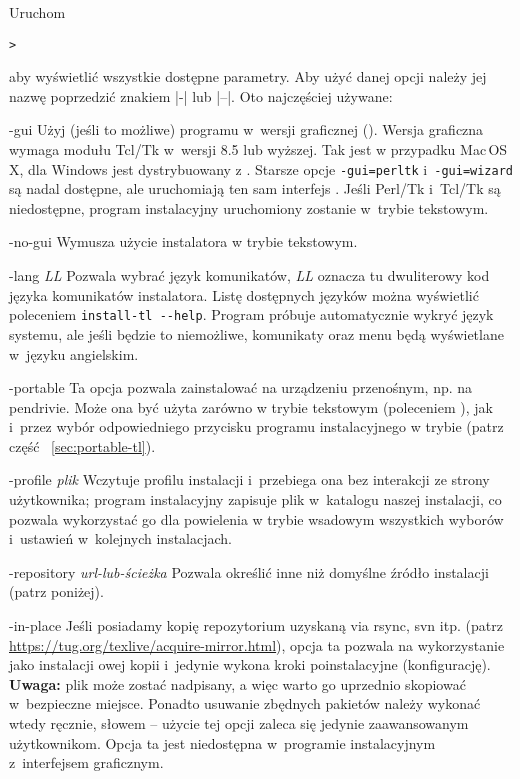 \documentclass{article}
\let\textsl\textit
\begin{document}
Uruchom
\begin{alltt}
> 
\end{alltt}
aby wyświetlić wszystkie dostępne parametry. Aby użyć danej opcji należy jej
nazwę poprzedzić znakiem |-| lub |--|.  Oto najczęściej używane:

\begin{ttdescription}
\item[-gui] Użyj (jeśli to możliwe) programu w~wersji graficznej (\GUI). Wersja graficzna wymaga
 modułu Tcl/Tk w~wersji 8.5 lub wyższej.  Tak jest w przypadku Mac\,OS\,X, dla Windows jest
 dystrybuowany z \TL. Starsze opcje  \texttt{-gui=perltk} i~\texttt{-gui=wizard} są nadal dostępne,
 ale uruchomiają ten sam interfejs \GUI{}. Jeśli  Perl/Tk i~Tcl/Tk są niedostępne,
 program instalacyjny uruchomiony zostanie w~trybie tekstowym.

\item[-no-gui] Wymusza użycie instalatora w trybie tekstowym.

\item[-lang {\sl LL}] Pozwala wybrać język komunikatów,
 \textsl{LL} oznacza tu dwuliterowy kod języka komunikatów instalatora. Listę dostępnych
 języków można wyświetlić poleceniem  \verb|install-tl --help|.
 Program próbuje automatycznie wykryć język systemu, ale jeśli będzie to niemożliwe,
 komunikaty oraz menu będą wyświetlane w~języku angielskim.

\item[-portable] Ta opcja pozwala zainstalować \TL{} na urządzeniu przenośnym, np. na pendrivie.
 Może ona być użyta zarówno w trybie tekstowym (poleceniem ),
 jak i~przez wybór odpowiedniego przycisku programu instalacyjnego w trybie
 \GUI{} (patrz część ~\ref{sec:portable-tl}).

\item[-profile {\sl plik}] Wczytuje  profilu instalacji
 i~przebiega ona bez interakcji ze strony użytkownika; program
 instalacyjny zapisuje plik  w~katalogu
  naszej instalacji, co pozwala wykorzystać go dla
 powielenia w trybie wsadowym wszystkich wyborów i~ustawień w~kolejnych
 instalacjach.

\item [-repository {\sl url-lub-ścieżka}] Pozwala określić inne niż
 domyślne źródło instalacji (patrz poniżej).

\item[-in-place] Jeśli posiadamy kopię repozytorium \TL{} uzyskaną via
 rsync, svn itp. (patrz \url{https://tug.org/texlive/acquire-mirror.html}),
 opcja ta pozwala na wykorzystanie jako instalacji owej kopii i~jedynie
 wykona kroki poinstalacyjne (konfigurację). \\
 \textbf{Uwaga:} plik
  może zostać nadpisany, a więc warto go
 uprzednio skopiować w~bezpieczne miejsce. Ponadto usuwanie zbędnych pakietów
 należy wykonać wtedy ręcznie, słowem -- użycie tej opcji zaleca się  jedynie
 zaawansowanym użytkownikom. Opcja ta jest niedostępna w~programie
 instalacyjnym z~interfejsem graficznym.
\end{ttdescription}
\end{document}
